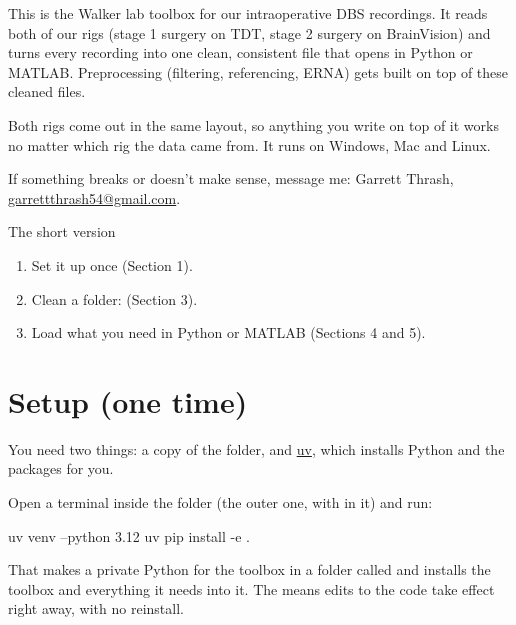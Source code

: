 
\renewcommand{\footname}{clean\_dbs \textperiodcentered\ User Guide}



This is the Walker lab toolbox for our intraoperative DBS recordings. It reads both of our rigs (stage 1 surgery on TDT, stage 2 surgery on BrainVision) and turns every recording into one clean, consistent file that opens in Python or MATLAB. Preprocessing (filtering, referencing, ERNA) gets built on top of these cleaned files.

Both rigs come out in the same layout, so anything you write on top of it works no matter which rig the data came from. It runs on Windows, Mac and Linux.

If something breaks or doesn't make sense, message me: Garrett Thrash, \href{mailto:garrettthrash54@gmail.com}{garrettthrash54@gmail.com}.

\begin{tip}{The short version}
\begin{enumerate}[topsep=0pt]
  \item Set it up once (Section 1).
  \item Clean a folder:  (Section 3).
  \item Load what you need in Python or MATLAB (Sections 4 and 5).
\end{enumerate}
\end{tip}

\section{Setup (one time)}

You need two things: a copy of the  folder, and \href{https://docs.astral.sh/uv/getting-started/installation/}{uv}, which installs Python and the packages for you.

Open a terminal inside the  folder (the outer one, with  in it) and run:
\begin{codebox}
uv venv --python 3.12
uv pip install -e .
\end{codebox}
That makes a private Python for the toolbox in a folder called  and installs the toolbox and everything it needs into it. The  means edits to the code take effect right away, with no reinstall.

